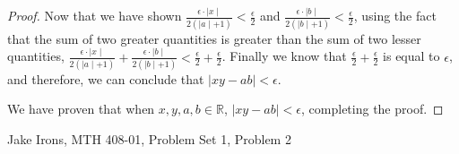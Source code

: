 \documentclass[11 pt]{article}
\newcommand{\newpar}{\vspace{.15in}\noindent}
\begin{document}
\begin{proof}
\newpar
 Now that we have shown $\frac{\epsilon\cdot\mid x\mid}{2(\mid a\mid+1)}<\frac{\epsilon}{2}$ and $\frac{\epsilon\cdot\mid b\mid}{2(\mid b\mid+1)}<\frac{\epsilon}{2}$, using the fact that the sum of two greater 
quantities is greater than the sum of two lesser quantities, $\frac{\epsilon\cdot\mid x\mid}{2(\mid a\mid+1)}+\frac{\epsilon\cdot\mid b\mid}{2(\mid b\mid+1)}<\frac{\epsilon}{2}+\frac{\epsilon}{2}$. Finally we know that $\frac{\epsilon}{2}+\frac{\epsilon}{2}$ is equal to $\epsilon$, and therefore, we can conclude that $\mid xy-ab\mid<\epsilon$.


\newpar
We have proven that when $x, y, a, b \in \mathbb{R}$, $\mid xy-ab\mid<\epsilon$, completing the proof.  
\end{proof}
\newpage
\noindent Jake Irons, MTH 408-01, Problem Set 1, Problem 2
\end{document}
